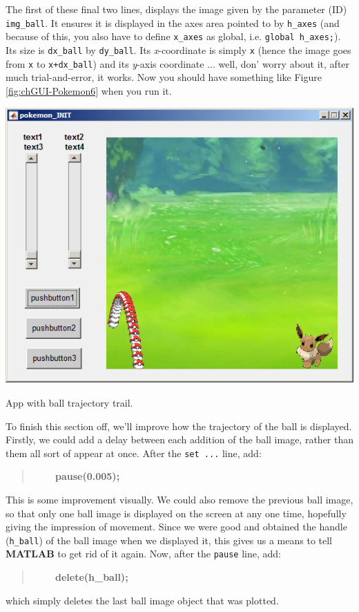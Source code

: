 \documentclass{tufte-book} %
\newenvironment{docspecbold}{\begin{quotation}\ttfamily\bfseries\parskip0pt\parindent0pt\ignorespaces}{\end{quotation}}
\begin{document}
The first of these final two lines, displays the image given by the parameter (ID) \texttt{img\_ball}. It ensures it is displayed in the axes area pointed to by \texttt{h\_axes} (and because of this, you also have to define \texttt{x\_axes} as global, i.e. \texttt{global h\_axes;}). Its size is \texttt{dx\_ball} by \texttt{dy\_ball}. Its \textit{x}-coordinate is simply \texttt{x} (hence the image goes from \texttt{x} to \texttt{x+dx\_ball}) and its \textit{y}-axis coordinate ... well, don' worry about it, after much trial-and-error, it works.
Now you should have something like Figure \ref{fig:chGUI-Pokemon6} when you run it.

\begin{marginfigure}[1.0in]
\includegraphics[width=\linewidth]{chGUI-Pokemon6.png}
\caption{App with ball trajectory trail.}
\label{fig:chGUI-Pokemon6}
\end{marginfigure}

To finish this section off, we'll improve how the trajectory of the ball is displayed. Firstly, we could add a delay between each addition of the ball image, rather than them all sort of appear at once. After the \texttt{set ...} line, add:
\begin{docspecbold}
\ \ \ \ pause(0.005);
\end{docspecbold}
This is some improvement visually. We could also remove the previous ball image, so that only one ball image is displayed on the screen at any one time, hopefully giving the impression of movement. Since we were good and obtained the handle (\texttt{h\_ball}) of the ball image when we displayed it, this gives us a means to tell \textbf{MATLAB} to get rid of it again. Now, after the \texttt{pause} line, add:
\begin{docspecbold}
\ \ \ \    delete(h\_ball);
\end{docspecbold}
which simply deletes the last ball image object that was plotted.
\end{document}
